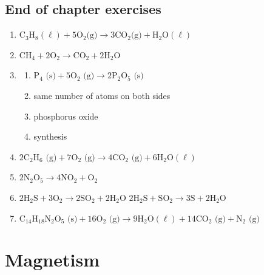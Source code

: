 \subsection{End of chapter exercises}
\begin{multicols}{2}
 \begin{enumerate}[noitemsep, label=\textbf{(\arabic*)} ]
\item ${\text{C}}_{3}{\text{H}}_{8} (\ell) + 5\text{O}_{2} \text{(g)} \to 3\text{CO}_{2} \text{(g)} + \text{H}_{2}\text{O} (\ell)$
\item $\text{CH}_{4} + 2\text{O}_{2} \to \text{CO}_{2} + 2\text{H}_{2}\text{O}$
\item 
 \begin{enumerate}[noitemsep, label=\textbf{(\alph*)} ]
\item $\text{P}_{4} \text{ (s)} + 5\text{O}_{2} \text{ (g)} \to 2\text{P}_{2}\text{O}_{5} \text{ (s)}$
\item same number of atoms on both sides
\item phosphorus oxide
\item synthesis
\end{enumerate}
\item $2\text{C}_{2}\text{H}_{6} \text{ (g)} + 7\text{O}_{2} \text{ (g)} \to 4\text{CO}_{2} \text{ (g)} + 6\text{H}_{2} \text{O} (\ell)$
\item $2\text{N}_{2}\text{O}_{5} \to 4\text{NO}_{2} + \text{O}_{2}$
\item $2\text{H}_{2}\text{S} + 3\text{O}_{2} \to 2\text{SO}_{2} + 2\text{H}_{2}\text{O}$ $2\text{H}_{2}\text{S} + \text{SO}_{2} \to 3\text{S} + 2\text{H}_{2}\text{O}$
\item $\text{C}_{14}\text{H}_{18}\text{N}_{2}\text{O}_{5} \text{ (s)} + 16\text{O}_{2} \text{ (g)} \to 9\text{H}_{2} \text{O} (\ell) + 14\text{CO}_{2} \text{ (g)} + \text{N}_{2} \text{ (g)}$
 \end{enumerate}
\end{multicols}

\section{Magnetism}
